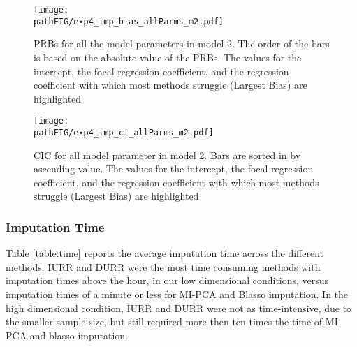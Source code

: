 \begin{figure}
	\centering
	\texttt{[image: \\pathFIG/exp4\_imp\_bias\_allParms\_m2.pdf]}
	\caption{PRBs for all the model parameters in model 2. 
		The order of the bars is based on the absolute value of the PRBs.
		The values for the intercept, the focal regression coefficient, and the regression coefficient with which most 
		methods struggle (Largest Bias) are highlighted}
	\label{fig:exp4_bias_allP}
\end{figure}

\begin{figure}
	\centering
	\texttt{[image: \\pathFIG/exp4\_imp\_ci\_allParms\_m2.pdf]}
	\caption{CIC for all model parameter in model 2.
		Bars are sorted in by ascending value.
		The values for the intercept, the focal regression coefficient, and the regression coefficient with which most 
		methods struggle (Largest Bias) are highlighted}
	\label{fig:exp4_ci_allP}
\end{figure}

\FloatBarrier

\subsubsection{Imputation Time}

	Table \ref{table:time} reports the average imputation time across the different methods.
	IURR and DURR were the most time consuming methods with imputation times above the hour, 
	in our low dimensional conditions, versus imputation times of a minute or less for MI-PCA and 
	Blasso imputation.
	In the high dimensional condition, IURR and DURR were not as time-intensive, due to the smaller
	sample size, but still required more then ten times the time of MI-PCA and blasso imputation.


\begin{table}[h]
   \begin{center}
    \end{center}
\caption{Average imputation time in minutes.} \label{table:time}
\end{table}

\FloatBarrier


